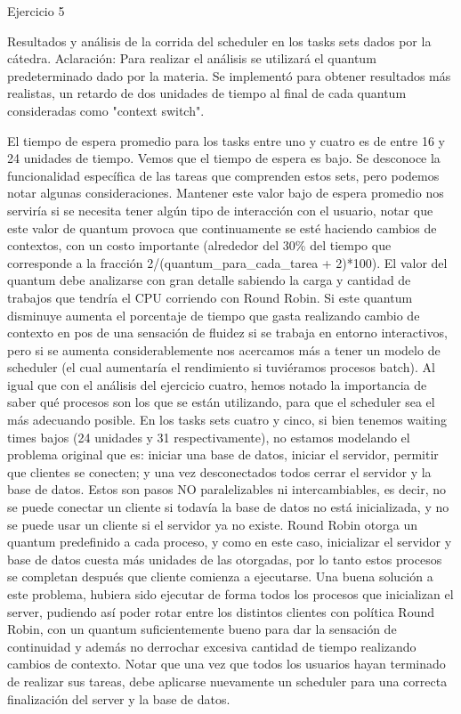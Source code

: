 
\begin{section}{Ejercicio 5}

	Resultados y análisis de la corrida del scheduler  en los tasks sets dados por la cátedra.
	Aclaración: Para realizar el análisis se utilizará el quantum predeterminado dado por la materia.
	Se implementó para obtener resultados más realistas, un retardo de dos unidades de tiempo al final de cada quantum consideradas como "context switch".

	El tiempo de espera promedio para los tasks entre uno y cuatro es de entre 16 y 24 unidades de tiempo.
	Vemos que el tiempo de espera es bajo. Se desconoce la funcionalidad específica de las tareas que comprenden estos sets, pero podemos notar algunas consideraciones. Mantener este valor bajo de espera promedio nos serviría si se necesita tener algún tipo de interacción con el usuario, notar que este valor de quantum provoca que continuamente se esté haciendo cambios de contextos, con un costo importante (alrededor del 30\% del tiempo que corresponde a la fracción 2/(quantum_para_cada_tarea + 2)*100).
	El valor del quantum debe analizarse con gran detalle sabiendo la carga y cantidad de trabajos que tendría el CPU corriendo con Round Robin. Si este quantum disminuye aumenta el porcentaje de tiempo que gasta realizando cambio de contexto en pos de una sensación de fluidez si se trabaja en entorno interactivos, pero si se aumenta considerablemente nos acercamos más a tener un modelo de scheduler  (el cual aumentaría el rendimiento si tuviéramos procesos batch).
	Al igual que con el análisis del ejercicio cuatro, hemos notado la importancia de saber qué procesos son los que se están utilizando, para que el scheduler sea el más adecuando posible. En los tasks sets cuatro y cinco, si bien tenemos waiting times bajos (24 unidades y 31 respectivamente), no estamos modelando el problema original que es: iniciar una base de datos, iniciar el servidor, permitir que clientes se conecten; y una vez desconectados todos cerrar el servidor y la base de datos. Estos son pasos NO paralelizables ni intercambiables, es decir, no se puede conectar un cliente si todavía la base de datos no está inicializada, y no se puede usar un cliente si el servidor ya no existe. Round Robin otorga un quantum predefinido a cada proceso, y como en este caso, inicializar el servidor y base de datos cuesta más unidades de las otorgadas, por lo tanto estos procesos se completan después que cliente comienza a ejecutarse. Una buena solución a este problema, hubiera sido ejecutar de forma  todos los procesos que inicializan el server, pudiendo así poder rotar entre los distintos clientes con política Round Robin, con un quantum suficientemente bueno para dar la sensación de continuidad y además no derrochar excesiva cantidad de tiempo realizando cambios de contexto. Notar que una vez que todos los usuarios hayan terminado de realizar sus tareas, debe aplicarse nuevamente un scheduler  para una correcta finalización del server y la base de datos.

\end{section}

